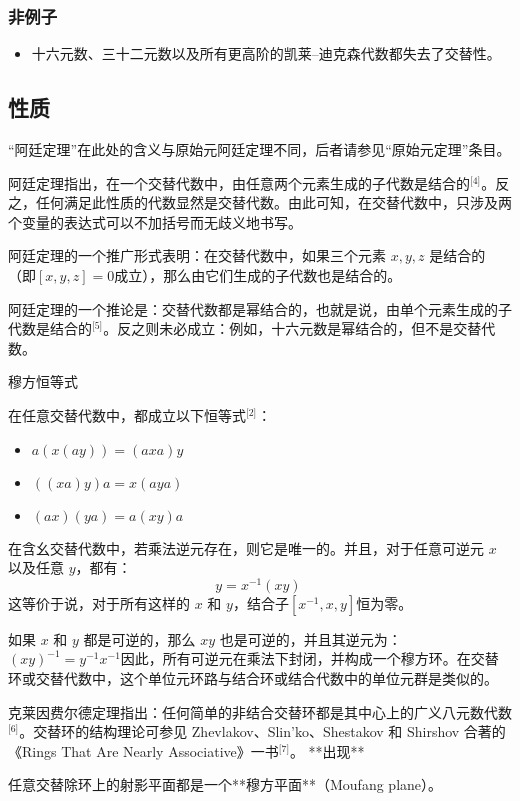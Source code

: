 \subsubsection{非例子}
\begin{itemize}
\item 十六元数、三十二元数以及所有更高阶的凯莱–迪克森代数都失去了交替性。
\end{itemize}
\subsection{性质}
“阿廷定理”在此处的含义与原始元阿廷定理不同，后者请参见“原始元定理”条目。

阿廷定理指出，在一个交替代数中，由任意两个元素生成的子代数是结合的\(^\text{[4]}\)。反之，任何满足此性质的代数显然是交替代数。由此可知，在交替代数中，只涉及两个变量的表达式可以不加括号而无歧义地书写。

阿廷定理的一个推广形式表明：在交替代数中，如果三个元素 $x, y, z$ 是结合的（即$
[x, y, z] = 0$成立），那么由它们生成的子代数也是结合的。

阿廷定理的一个推论是：交替代数都是幂结合的，也就是说，由单个元素生成的子代数是结合的\(^\text{[5]}\)。反之则未必成立：例如，十六元数是幂结合的，但不是交替代数。

穆方恒等式

在任意交替代数中，都成立以下恒等式\(^\text{[2]}\)：
\begin{itemize}
\item $a(x(ay)) = (axa)y$
\item $((xa)y)a = x(aya)$
\item $(ax)(ya) = a(xy)a$
\end{itemize}
在含幺交替代数中，若乘法逆元存在，则它是唯一的。并且，对于任意可逆元 $x$ 以及任意 $y$，都有：
$$
y = x^{-1}(xy)~
$$
这等价于说，对于所有这样的 $x$ 和 $y$，结合子$[x^{-1}, x, y]$恒为零。

如果 $x$ 和 $y$ 都是可逆的，那么 $xy$ 也是可逆的，并且其逆元为：$(xy)^{-1} = y^{-1}x^{-1}$因此，所有可逆元在乘法下封闭，并构成一个穆方环。在交替环或交替代数中，这个单位元环路与结合环或结合代数中的单位元群是类似的。

克莱因费尔德定理指出：任何简单的非结合交替环都是其中心上的广义八元数代数\(^\text{[6]}\)。交替环的结构理论可参见 Zhevlakov、Slin'ko、Shestakov 和 Shirshov 合著的《Rings That Are Nearly Associative》一书\(^\text{[7]}\)。
**出现**

任意交替除环上的射影平面都是一个**穆方平面**（Moufang plane）。

